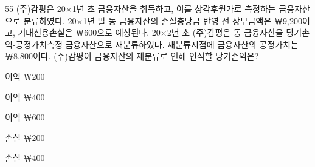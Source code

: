 \begin{question}{55}
(주)감평은 20×1년 초 금융자산을 취득하고, 이를 상각후원가로 측정하는 금융자산으로 분류하였다. 20×1년 말 동 금융자산의 손실충당금 반영 전 장부금액은 ￦9,200이고, 기대신용손실은 ￦600으로 예상된다. 20×2년 초 (주)감평은 동 금융자산을 당기손익-공정가치측정 금융자산으로 재분류하였다. 재분류시점에 금융자산의 공정가치는 ￦8,800이다. (주)감평이 금융자산의 재분류로 인해 인식할 당기손익은?
\begin{choices}
  \item 이익 ￦200
  \item 이익 ￦400
  \item 이익 ￦600
  \item 손실 ￦200
  \item 손실 ￦400
\end{choices}
\end{question}
